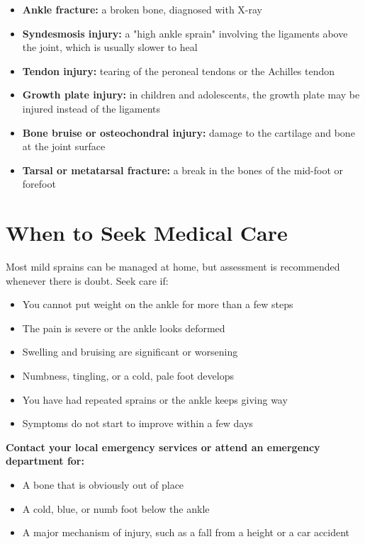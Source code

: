 \begin{itemize}
    \item \textbf{Ankle fracture:} a broken bone, diagnosed with X-ray
    \item \textbf{Syndesmosis injury:} a "high ankle sprain" involving the ligaments above the joint, which is usually slower to heal
    \item \textbf{Tendon injury:} tearing of the peroneal tendons or the Achilles tendon
    \item \textbf{Growth plate injury:} in children and adolescents, the growth plate may be injured instead of the ligaments
    \item \textbf{Bone bruise or osteochondral injury:} damage to the cartilage and bone at the joint surface
    \item \textbf{Tarsal or metatarsal fracture:} a break in the bones of the mid-foot or forefoot
\end{itemize}

\section*{When to Seek Medical Care}
Most mild sprains can be managed at home, but assessment is recommended whenever there is doubt. Seek care if:

\begin{itemize}
    \item You cannot put weight on the ankle for more than a few steps
    \item The pain is severe or the ankle looks deformed
    \item Swelling and bruising are significant or worsening
    \item Numbness, tingling, or a cold, pale foot develops
    \item You have had repeated sprains or the ankle keeps giving way
    \item Symptoms do not start to improve within a few days
\end{itemize}

\textbf{Contact your local emergency services or attend an emergency department for:}
\begin{itemize}
    \item A bone that is obviously out of place
    \item A cold, blue, or numb foot below the ankle
    \item A major mechanism of injury, such as a fall from a height or a car accident
\end{itemize}

